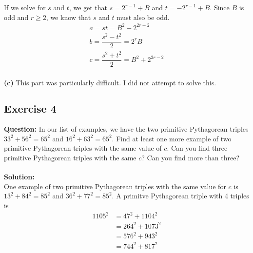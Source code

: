 \documentclass{article}
\begin{document}
If we solve for $s$ and $t$, we get that $s = 2^{r-1}+B$ and $t = -2^{r-1}+B$. Since $B$ is odd and $r\geq 2$, we know that $s$ and $t$ must also be odd.
\begin{equation*}
\begin{split}
a = st = B^{2}-2^{2r-2}
\\ b = \dfrac{s^{2}-t^{2}}{2} = 2^{r}B
\\ c = \dfrac{s^{2}+t^{2}}{2} = B^{2}+2^{2r-2}
\end{split}
\end{equation*}
\\\textbf{(c)} This part was particularly difficult. I did not attempt to solve this. 
\newpage
\subsection{Exercise 4}
\textbf{Question:} In our list of examples, we have the two primitive Pythagorean triples $33^{2}+56^{2}=65^{2}$ and $16^{2}+63^{2}=65^{2}$. Find at least one more example of two primitive Pythagorean triples with the same value of $c$. Can you find three primitive Pythagorean triples with the same $c$? Can you find more than three?\\
\\\textbf{Solution:}\\
One example of two primitive Pythagorean triples with the same value for $c$ is $13^{2}+84^{2} = 85^{2}$ and $36^{2}+77^{2} = 85^{2}$. A primitve Pythagorean triple with 4 triples is
\begin{equation*}
\begin{split}
1105^2
&=47^2+1104^2\\
&=264^2+1073^2\\
&=576^2+943^2\\
&=744^2+817^2
\end{split}
\end{equation*}
\newpage
\end{document}
